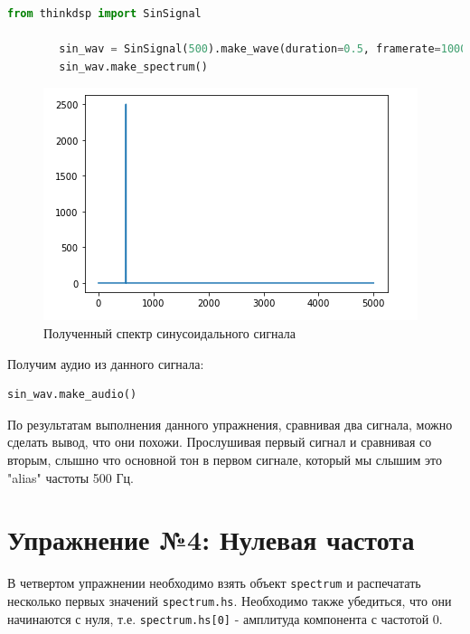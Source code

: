 \documentclass[a4paper, 14pt]{extarticle}
\begin{document}
    \begin{lstlisting}[language=Python, caption= Создание синусоидального сигнала и получение его спектра, label={lst:make_sin_signal_spectr}]
        from thinkdsp import SinSignal

        sin_wav = SinSignal(500).make_wave(duration=0.5, framerate=10000)
        sin_wav.make_spectrum()
    \end{lstlisting}

    \begin{figure}[H]
        \centering
        \includegraphics[width=\textwidth]{sin_spectr}
        \caption{Полученный спектр синусоидального сигнала}
        \label{fig:sin_signal_spectr}
    \end{figure}

    Получим аудио из данного сигнала:

    \begin{lstlisting}[language=Python, caption= Получение аудио, label={lst:sin_make_audio}]
        sin_wav.make_audio()
    \end{lstlisting}

    По результатам выполнения данного упражнения, сравнивая два сигнала, можно сделать вывод, что они похожи.
    Прослушивая первый сигнал и сравнивая со вторым, слышно что основной тон в первом сигнале, который мы слышим это "alias" частоты 500 Гц.

    \newpage


    \section{Упражнение №4: Нулевая частота}
    \label{sec:4_zero_freq}

    В четвертом упражнении необходимо взять объект \texttt{spectrum} и распечатать несколько первых значений \texttt{spectrum.hs}.
    Необходимо также убедиться, что они начинаются с нуля, т.е. \texttt{spectrum.hs[0]} - амплитуда компонента с частотой 0.
\end{document}
